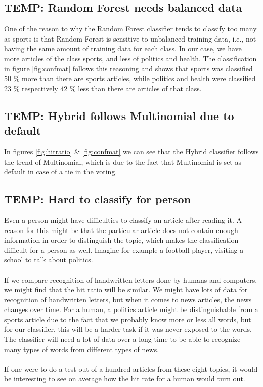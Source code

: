 \subsection{TEMP: Random Forest needs balanced data} %
\label{sub:temp_random_forest_needs_balanced_data}
One of the reason to why the Random Forest classifier tends to classify too many as sports is that Random Forest is sensitive to unbalanced training data, i.e., not having the same amount of training data for each class. In our case, we have more articles of the class sports, and less of politics and health. The classification in figure \ref{fig:confmat} follows this reasoning and shows that sports was classified 50 \% more than there are sports articles, while politics and health were classified 23 \% respectively 42 \% less than there are articles of that class.

\subsection{TEMP: Hybrid follows Multinomial due to default} %
\label{sub:temp_hybrid_follows_multinomial_due_to_default}
In figures \ref{fig:hitratio} \& \ref{fig:confmat} we can see that the Hybrid classifier follows the trend of Multinomial, which is due to the fact that Multinomial is set as default in case of a tie in the voting.

\subsection{TEMP: Hard to classify for person} %
\label{sub:temp_hard_to_classify_for_person}
Even a person might have difficulties to classify an article after reading it. A reason for this might be that the particular article does not contain enough information in order to distinguish the topic, which makes the classification difficult for a person as well. Imagine for example a football player, visiting a school to talk about politics.
\\\\
If we compare recognition of handwritten letters done by humans and computers, we might find that the hit ratio will be similar. We might have lots of data for recognition of handwritten letters, but when it comes to news articles, the news changes over time. For a human, a politics article might be distinguishable from a sports article due to the fact that we probably know more or less all words, but for our classifier, this will be a harder task if it was never exposed to the words. The classifier will need a lot of data over a long time to be able to recognize many types of words from different types of news.
\\\\
If one were to do a test out of a hundred articles from these eight topics, it would be interesting to see on average how the hit rate for a human would turn out.

